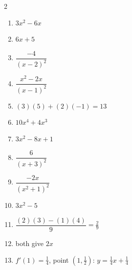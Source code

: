 \documentclass[11pt]{article}
\begin{document}
\begin{keybox}
\begin{multicols}{2}
\small
\begin{enumerate}[leftmargin=*,itemsep=3pt]
  \item $3x^2-6x$
  \item $6x+5$
  \item $\dfrac{-4}{(x-2)^2}$
  \item $\dfrac{x^2-2x}{(x-1)^2}$
  \item $(3)(5)+(2)(-1)=13$
  \item $10x^4+4x^3$
  \item $3x^2-8x+1$
  \item $\dfrac{6}{(x+3)^2}$
  \item $\dfrac{-2x}{(x^2+1)^2}$
  \item $3x^2-5$
  \item $\dfrac{(2)(3)-(1)(4)}{9}=\tfrac29$
  \item both give $2x$
  \item $f'(1)=\tfrac14$, point $(1,\tfrac12)$: $y=\tfrac14x+\tfrac14$
\end{enumerate}
\end{multicols}
\end{keybox}
\end{document}
